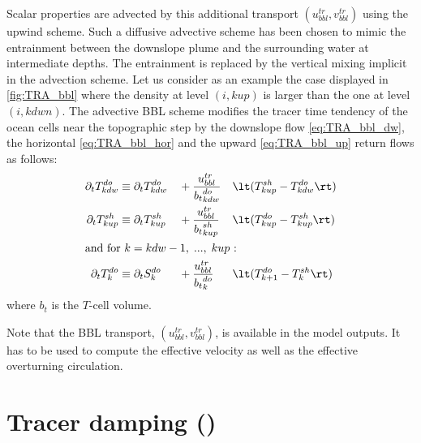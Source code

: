 \documentclass[../main/NEMO_manual]{subfiles}
\begin{document}
Scalar properties are advected by this additional transport $(u^{tr}_{bbl},v^{tr}_{bbl})$ using
the upwind scheme.
Such a diffusive advective scheme has been chosen to mimic the entrainment between
the downslope plume and the surrounding water at intermediate depths.
The entrainment is replaced by the vertical mixing implicit in the advection scheme.
Let us consider as an example the case displayed in \autoref{fig:TRA_bbl} where
the density at level $(i,kup)$ is larger than the one at level $(i,kdwn)$.
The advective BBL scheme modifies the tracer time tendency of
the ocean cells near the topographic step by the downslope flow \autoref{eq:TRA_bbl_dw},
the horizontal \autoref{eq:TRA_bbl_hor} and the upward \autoref{eq:TRA_bbl_up} return flows as follows:
\begin{alignat}{5}
  \label{eq:TRA_bbl_dw}
  \partial_t T^{do}_{kdw} &\equiv \partial_t T^{do}_{kdw} &&+ \frac{u^{tr}_{bbl}}{{b_t}^{do}_{kdw}} &&\lt( T^{sh}_{kup} - T^{do}_{kdw} \rt) \\
  \label{eq:TRA_bbl_hor}
  \partial_t T^{sh}_{kup} &\equiv \partial_t T^{sh}_{kup} &&+ \frac{u^{tr}_{bbl}}{{b_t}^{sh}_{kup}} &&\lt( T^{do}_{kup} - T^{sh}_{kup} \rt) \\
  \shortintertext{and for $k =kdw-1,\;..., \; kup$ :}
  \label{eq:TRA_bbl_up}
  \partial_t T^{do}_{k}   &\equiv \partial_t S^{do}_{k}   &&+ \frac{u^{tr}_{bbl}}{{b_t}^{do}_{k}}   &&\lt( T^{do}_{k +1} - T^{sh}_{k}   \rt)
\end{alignat}
where $b_t$ is the $T$-cell volume.

Note that the BBL transport, $(u^{tr}_{bbl},v^{tr}_{bbl})$, is available in the model outputs.
It has to be used to compute the effective velocity as well as the effective overturning circulation.

\section[Tracer damping (\textit{tradmp.F90})]{Tracer damping (\protect{})}
\label{sec:TRA_dmp}

\begin{listing}
  \caption{}
  \label{lst:namtra_dmp}
\end{listing}
\end{document}
